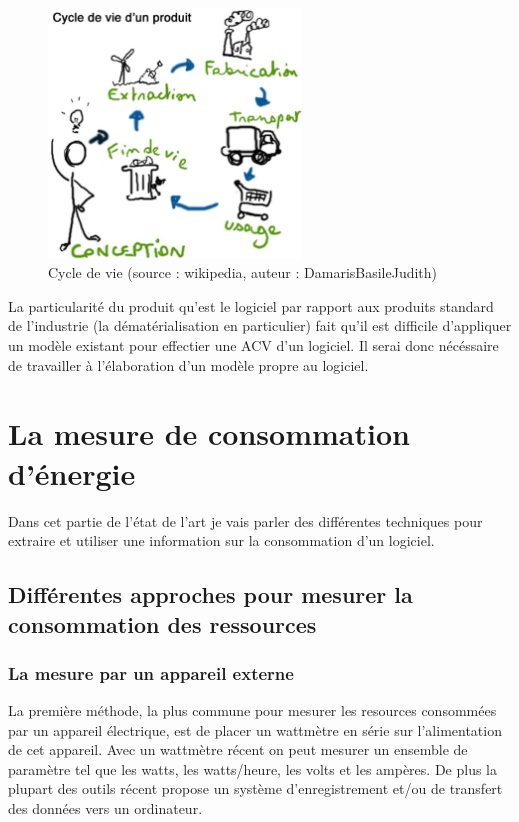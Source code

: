 \documentclass[a4paper, 11pt]{report}
\begin{document}
\begin{figure}
	\centering
	\includegraphics[width=0.6\textwidth]{figures/Cycle-de-vie.eps}
	\caption{Cycle de vie (source : wikipedia, auteur : DamarisBasileJudith)}
	\label{CdV}
\end{figure}

La particularité du produit qu'est le logiciel par rapport aux produits standard de l'industrie (la dématérialisation en particulier) fait qu'il est difficile d'appliquer un modèle existant pour effectier une ACV d'un logiciel. Il serai donc nécéssaire de travailler à l'élaboration d'un modèle propre au logiciel.
			\subsubsection{}
			
		
	\section{La mesure de consommation d'énergie}
Dans cet partie de l'état de l'art je vais parler des différentes techniques pour extraire et utiliser une information sur la consommation d'un logiciel.
		\subsection{Différentes approches pour mesurer la consommation des ressources}
			\subsubsection{La mesure par un appareil externe}
La première méthode, la plus commune pour mesurer les resources consommées par un appareil électrique, est de placer un wattmètre en série sur l'alimentation de cet appareil. Avec un wattmètre récent on peut mesurer un ensemble de paramètre tel que les watts, les watts/heure, les volts et les ampères. De plus la plupart des outils récent propose un système d'enregistrement et/ou de transfert des données vers un ordinateur.
\end{document}
